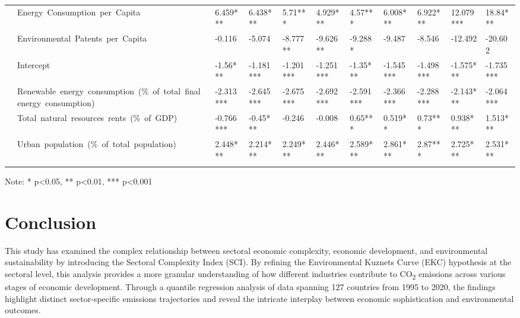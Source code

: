 \documentclass[10pt]{article}
\begin{document}
\begin{table}[H]
\begin{adjustbox}{width=\textwidth,center}
\begin{tabular}{lllllllllll}
      & Energy\ Consumption\ per\ Capita & 6.459*** & 6.438*** & 5.71*** & 4.929*** & 4.57*** & 6.008*** & 6.922*** & 12.079*** & 18.84*** \\
      & Environmental\ Patents\ per\ Capita & -0.116 & -5.074 & -8.777** & -9.626** & -9.288* & -9.487 & -8.546 & -12.492 & -20.602 \\
      & Intercept & -1.56*** & -1.181*** & -1.201*** & -1.251*** & -1.35*** & -1.545*** & -1.498*** & -1.575*** & -1.735*** \\
      & Renewable\ energy\ consumption\ (\%\ of\ total\ final\ energy\ consumption) & -2.313*** & -2.645*** & -2.675*** & -2.692*** & -2.591*** & -2.366*** & -2.288*** & -2.143*** & -2.064*** \\
      & Total\ natural\ resources\ rents\ (\%\ of\ GDP) & -0.766*** & -0.45*** & -0.246 & -0.008 & 0.65*** & 0.519** & 0.73*** & 0.938*** & 1.513*** \\
      & Urban\ population\ (\%\ of\ total\ population) & 2.448*** & 2.214*** & 2.249*** & 2.446*** & 2.589*** & 2.861*** & 2.87*** & 2.725*** & 2.531*** \\
      \cline{1-11}
      \bottomrule
      \label{tab:lm-li-coefficients}
      \end{tabular}
      \end{adjustbox}
      {\centering\tiny Note: * p\textless0.05, ** p\textless0.01, *** p\textless0.001\par}
      \hfill
\end{table}


\section{Conclusion}
This study has examined the complex relationship between sectoral economic complexity, economic development, and environmental sustainability by introducing the Sectoral Complexity Index (SCI). By refining the Environmental Kuznets Curve (EKC) hypothesis at the sectoral level, this analysis provides a more granular understanding of how different industries contribute to CO\textsubscript{2} emissions across various stages of economic development. Through a quantile regression analysis of data spanning 127 countries from 1995 to 2020, the findings highlight distinct sector-specific emissions trajectories and reveal the intricate interplay between economic sophistication and environmental outcomes.
\end{document}
